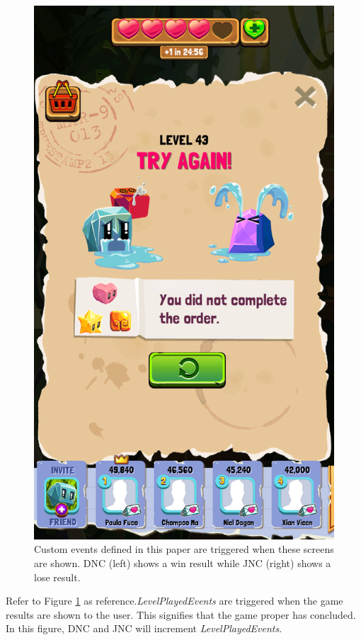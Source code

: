 \begin{figure}[h]
\includegraphics[scale=0.16]{figures/jnc_lose.png} 
\caption{Custom events defined in this paper are triggered when these screens are shown. DNC (left) shows a win result while JNC (right) shows a lose result.}
\label{fig:win_lose_sample}
\end{figure}

Refer to Figure \ref{fig:win_lose_sample} as reference.\textit{LevelPlayedEvents} are triggered when the game results are shown to the user. This signifies that the game proper has concluded. In this figure, DNC and JNC will increment \textit{LevelPlayedEvents}.

